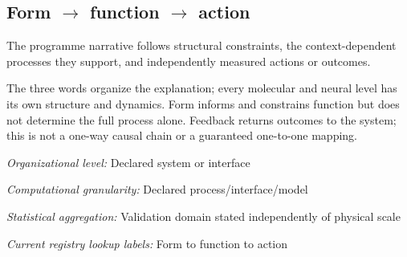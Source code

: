 \begin{samepage}
\subsection*{Form \(\rightarrow\) function \(\rightarrow\) action}
\noindent The programme narrative follows structural constraints, the context-dependent processes they support, and independently measured actions or outcomes.\par
\end{samepage}
\noindent The three words organize the explanation; every molecular and neural level has its own structure and dynamics. Form informs and constrains function but does not determine the full process alone. Feedback returns outcomes to the system; this is not a one-way causal chain or a guaranteed one-to-one mapping.\par
\noindent\textit{Organizational level:} Declared system or interface\par
\noindent\textit{Computational granularity:} Declared process/interface/model\par
\begin{samepage}
\noindent\textit{Statistical aggregation:} Validation domain stated independently of physical scale\par\nopagebreak[4]

\end{samepage}


\noindent\textit{Current registry lookup labels:} Form to function to action\par

